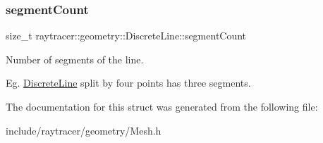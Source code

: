 \subsubsection{\texorpdfstring{segment\+Count}{segmentCount}}
{\footnotesize\ttfamily size\+\_\+t raytracer\+::geometry\+::\+Discrete\+Line\+::segment\+Count}



Number of segments of the line. 

Eg. \hyperlink{structraytracer_1_1geometry_1_1DiscreteLine}{Discrete\+Line} split by four points has three segments. 

The documentation for this struct was generated from the following file\+:\begin{DoxyCompactItemize}
\item 
include/raytracer/geometry/Mesh.\+h\end{DoxyCompactItemize}
